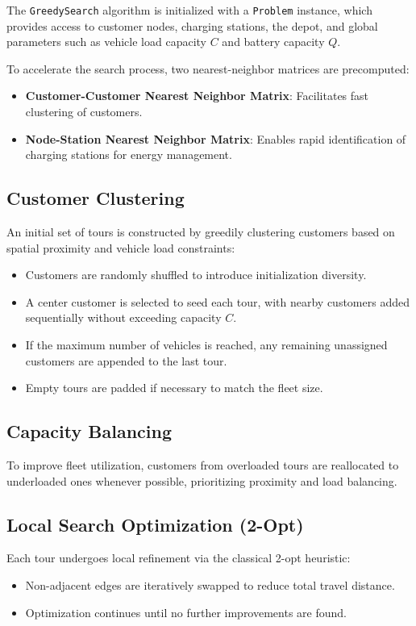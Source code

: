 The \texttt{GreedySearch} algorithm is initialized with a \texttt{Problem} instance, which provides access to customer nodes, charging stations, the depot, and global parameters such as vehicle load capacity \( C \) and battery capacity \( Q \).

To accelerate the search process, two nearest-neighbor matrices are precomputed:
\begin{itemize}
    \item \textbf{Customer-Customer Nearest Neighbor Matrix}: Facilitates fast clustering of customers.
    \item \textbf{Node-Station Nearest Neighbor Matrix}: Enables rapid identification of charging stations for energy management.
\end{itemize}

\subsection{Customer Clustering}

An initial set of tours is constructed by greedily clustering customers based on spatial proximity and vehicle load constraints:
\begin{itemize}
    \item Customers are randomly shuffled to introduce initialization diversity.
    \item A center customer is selected to seed each tour, with nearby customers added sequentially without exceeding capacity \( C \).
    \item If the maximum number of vehicles is reached, any remaining unassigned customers are appended to the last tour.
    \item Empty tours are padded if necessary to match the fleet size.
\end{itemize}

\subsection{Capacity Balancing}

To improve fleet utilization, customers from overloaded tours are reallocated to underloaded ones whenever possible, prioritizing proximity and load balancing.

\subsection{Local Search Optimization (2-Opt)}

Each tour undergoes local refinement via the classical 2-opt heuristic:
\begin{itemize}
    \item Non-adjacent edges are iteratively swapped to reduce total travel distance.
    \item Optimization continues until no further improvements are found.
\end{itemize}


